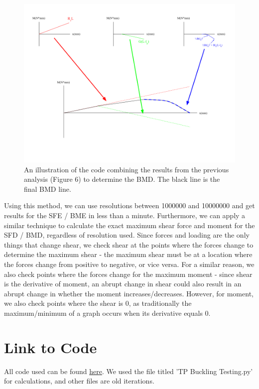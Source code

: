 \documentclass[11pt]{article}
\begin{document}
\begin{figure}[h]
\centering
\includegraphics[scale = 0.5]{images/BMD Code Explanation 2.png}
\caption{An illustration of the code combining the results from the previous analysis (Figure 6) to determine the BMD. The black line is the final BMD line.}
\end{figure}
\pagebreak
\par Using this method, we can use resolutions between 1000000 and 10000000 and get results for the SFE / BME in less than a minute. Furthermore, we can apply a similar technique to calculate the exact maximum shear force and moment for the SFD / BMD, regardless of resolution used. Since forces and loading are the only things that change shear, we check shear at the points where the forces change to determine the maximum shear - the maximum shear must be at a location where the forces change from positive to negative, or vice versa. For a similar reason, we also check points where the forces change for the maximum moment - since shear is the derivative of moment, an abrupt change in shear could also result in an abrupt change in whether the moment increases/decreases. However, for moment, we also check points where the shear is 0, as traditionally the maximum/minimum of a graph occurs when its derivative equals 0.
\par 

\section{Link to Code}
All code used can be found \href{https://github.com/epsilon-naut/CIV102-Bridge-Project}{here}. We used the file titled 'TP Buckling Testing.py' for calculations, and other files are old iterations. 
\end{document}
